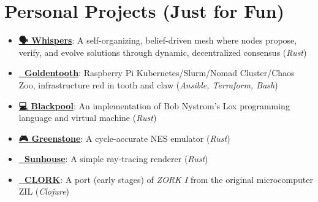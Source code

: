 \documentclass[letterpaper,11pt]{article}
\newcommand{\resumeSubHeadingListStart}{\begin{itemize}[leftmargin=0.15in, label={}]}
\newcommand{\resumeSubHeadingListEnd}{\end{itemize}}
\newenvironment{resumeListicle}{
    \small        %
    \setlength{\itemsep}{0pt}
    \setlength{\parskip}{0pt}
}{}
\newcommand{\resumeListicleStart}{\begin{resumeListicle}}
\newcommand{\resumeListicleEnd}{\end{resumeListicle}}
\newcommand{\resumeSideProjectListicleItem}[4]{%
  \item \textbf{\href{#1}{#2}}: #3 (\emph{#4})%
}
\begin{document}
\section{Personal Projects (Just for Fun)}
  \resumeSubHeadingListStart
    \resumeListicleStart
      \resumeSideProjectListicleItem{https://github.com/ndouglas/whispers/}{🗣️ Whispers}{A self-organizing, belief-driven mesh where nodes propose, verify, and evolve solutions through dynamic, decentralized consensus}{Rust} \\
      \resumeSideProjectListicleItem{https://github.com/goldentooth/}{🦷 Goldentooth}{Raspberry Pi Kubernetes/Slurm/Nomad Cluster/Chaos Zoo, infrastructure red in tooth and claw}{Ansible, Terraform, Bash} \\
      \resumeSideProjectListicleItem{https://github.com/ndouglas/blackpool/}{💻 Blackpool}{An implementation of Bob Nystrom's Lox programming language and virtual machine}{Rust} \\
      \resumeSideProjectListicleItem{https://github.com/ndouglas/greenstone/}{🎮 Greenstone}{A cycle-accurate NES emulator}{Rust} \\
      \resumeSideProjectListicleItem{https://github.com/ndouglas/sunhouse/}{🌈 Sunhouse}{A simple ray-tracing renderer}{Rust} \\
      \resumeSideProjectListicleItem{https://github.com/ndouglas/clork/}{📜 CLORK}{A port (early stages) of \emph{ZORK I} from the original microcomputer ZIL}{Clojure} \\
    \resumeListicleEnd
  \resumeSubHeadingListEnd

\end{document}
